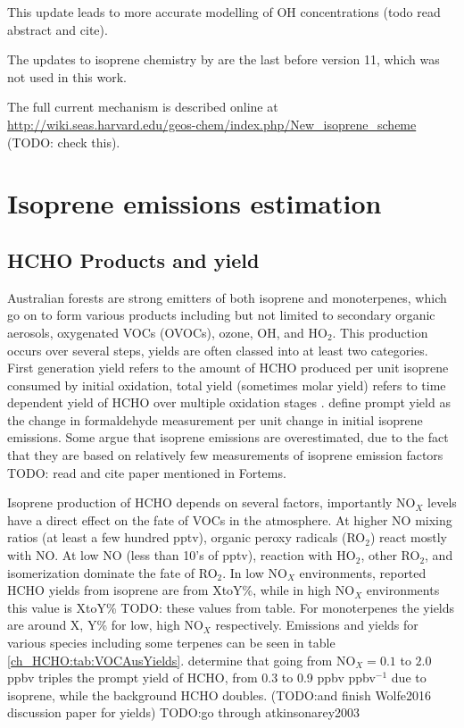     
    This update leads to more accurate modelling of OH concentrations \citep{Mao2012} (todo read abstract and cite).
    
    The updates to isoprene chemistry by \citet{Mao2013} are the last before version 11, which was not used in this work.

    The full current mechanism is described online at \url{http://wiki.seas.harvard.edu/geos-chem/index.php/New_isoprene_scheme} (TODO: check this).
    

\section{Isoprene emissions estimation}
\label{ch_isop:sec:IsopreneEmissions}

  \subsection{HCHO Products and yield}
    Australian forests are strong emitters of both isoprene and monoterpenes, which go on to form various products including but not limited to secondary organic aerosols, oxygenated VOCs (OVOCs), ozone, OH, and HO$_2$.
    This production occurs over several steps, yields are often classed into at least two categories.
    First generation yield refers to the amount of HCHO produced per unit isoprene consumed by initial oxidation, total yield (sometimes molar yield) refers to time dependent yield of HCHO over multiple oxidation stages \citep{Wolfe2016}.
    \citet{Wolfe2016} define prompt yield as the change in formaldehyde measurement per unit change in initial isoprene emissions.
    Some argue that isoprene emissions are overestimated, due to the fact that they are based on relatively few measurements of isoprene emission factors \citep{Winters2009, FortemsCheiney2012} TODO: read and cite paper mentioned in Fortems.
    
    Isoprene production of HCHO depends on several factors, importantly NO$_X$ levels have a direct effect on the fate of VOCs in the atmosphere.
    At higher NO mixing ratios (at least a few hundred pptv), organic peroxy radicals (RO$_2$) react mostly with NO. 
    At low NO (less than 10's of pptv), reaction with HO$_2$, other RO$_2$, and isomerization dominate the fate of RO$_2$.
    In low NO$_X$ environments, reported HCHO yields from isoprene are from XtoY\%, while in high NO$_X$ environments this value is XtoY\% TODO: these values from table.
    For monoterpenes the yields are around X, Y\% for low, high NO$_X$ respectively.
    Emissions and yields for various species including some terpenes can be seen in table \ref{ch_HCHO:tab:VOCAusYields}.
    \citet{Wolfe2016} determine that going from NO$_X = 0.1$ to $2.0$ ppbv triples the prompt yield of HCHO, from 0.3 to 0.9 ppbv ppbv$^{-1}$ due to isoprene, while the background HCHO doubles.
    (TODO:and finish Wolfe2016 discussion paper for yields)
    TODO:go through atkinsonarey2003
    
